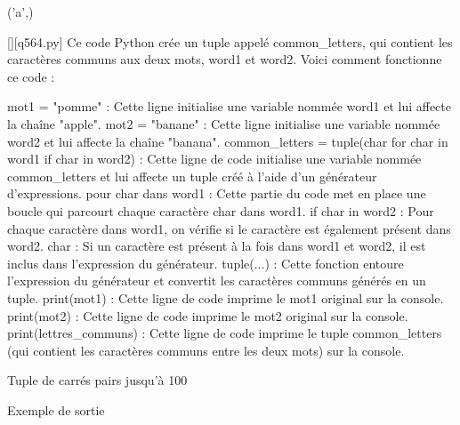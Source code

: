 ('a',)
        \par
        \begin{solution}
            \renewcommand{\nomfichier}{q564.py}
            \pythonfile{\chemincode \nomfichier}[][\nomfichier]
            Ce code Python crée un tuple appelé common\_letters, qui contient les caractères communs aux deux mots, word1 et word2. Voici comment fonctionne ce code :

    mot1 = "pomme" : Cette ligne initialise une variable nommée word1 et lui affecte la chaîne "apple".
    mot2 = "banane" : Cette ligne initialise une variable nommée word2 et lui affecte la chaîne "banana".
    common\_letters = tuple(char for char in word1 if char in word2) : Cette ligne de code initialise une variable nommée common\_letters et lui affecte un tuple créé à l'aide d'un générateur d'expressions.
        pour char dans word1 : Cette partie du code met en place une boucle qui parcourt chaque caractère char dans word1.
        if char in word2 : Pour chaque caractère dans word1, on vérifie si le caractère est également présent dans word2.
        char : Si un caractère est présent à la fois dans word1 et word2, il est inclus dans l'expression du générateur.
        tuple(...) : Cette fonction entoure l'expression du générateur et convertit les caractères communs générés en un tuple.
    print(mot1) : Cette ligne de code imprime le mot1 original sur la console.
    print(mot2) : Cette ligne de code imprime le mot2 original sur la console.
    print(lettres\_communs) : Cette ligne de code imprime le tuple common\_letters (qui contient les caractères communs entre les deux mots) sur la console.
        \end{solution}
        

        \question
        Tuple de carrés pairs jusqu'à 100

Exemple de sortie

